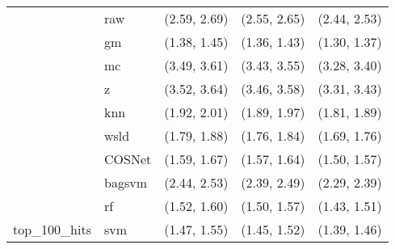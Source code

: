 \begin{table}[H]
{\begin{tabular}{lllll}
 & raw & (2.59, 2.69) & (2.55, 2.65) & (2.44, 2.53)\\

 & gm & (1.38, 1.45) & (1.36, 1.43) & (1.30, 1.37)\\

 & mc & (3.49, 3.61) & (3.43, 3.55) & (3.28, 3.40)\\

 & z & (3.52, 3.64) & (3.46, 3.58) & (3.31, 3.43)\\

 & knn & (1.92, 2.01) & (1.89, 1.97) & (1.81, 1.89)\\

 & wsld & (1.79, 1.88) & (1.76, 1.84) & (1.69, 1.76)\\

 & COSNet & (1.59, 1.67) & (1.57, 1.64) & (1.50, 1.57)\\

 & bagsvm & (2.44, 2.53) & (2.39, 2.49) & (2.29, 2.39)\\

 & rf & (1.52, 1.60) & (1.50, 1.57) & (1.43, 1.51)\\

\multirow{-15}{*}{\raggedright\arraybackslash top\_100\_hits} & svm & (1.47, 1.55) & (1.45, 1.52) & (1.39, 1.46)\\
\bottomrule
\end{tabular}}
\end{table}
